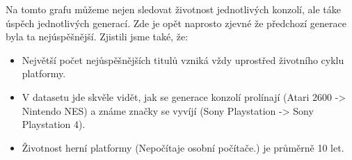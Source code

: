 \documentclass[a4paper,11pt]{article}
\begin{document}
Na tomto grafu můžeme nejen sledovat životnost jednotlivých konzolí, ale táke úspěch jednotlivých generací. Zde je opět naprosto zjevné že předchozí generace byla ta  nejúspěšnější. Zjistili jsme také, že:

\begin{itemize}
\item Největší počet nejůspěšnějších titulů vzniká vždy uprostřed životního cyklu platformy.

\item V datasetu jde skvěle vidět, jak se generace konzolí prolínají (Atari 2600 -> Nintendo NES) a známe značky se vyvíjí (Sony Playstation -> Sony Playstation 4).

\item Životnost herní platformy (Nepočítaje osobní počítače.) je průměrně 10 let.

\end{itemize}



\newpage
\end{document}
